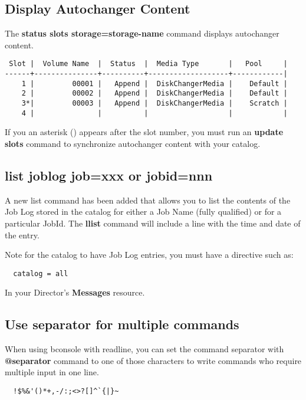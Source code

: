 \subsection{Display Autochanger Content}

The {\bf status slots storage=\lt{}storage-name\gt{}} command displays
autochanger content.

\footnotesize
\begin{verbatim}
 Slot |  Volume Name  |  Status  |  Media Type       |   Pool     |
------+---------------+----------+-------------------+------------|
    1 |         00001 |   Append |  DiskChangerMedia |    Default |
    2 |         00002 |   Append |  DiskChangerMedia |    Default |
    3*|         00003 |   Append |  DiskChangerMedia |    Scratch |
    4 |               |          |                   |            |
\end{verbatim}
\normalsize

If you an asterisk ({\bf *}) appears after the slot number, you must run an
{\bf update slots} command to synchronize autochanger content with your
catalog.

\subsection{list joblog job=xxx or jobid=nnn}
A new list command has been added that allows you to list the contents
of the Job Log stored in the catalog for either a Job Name (fully qualified)
or for a particular JobId.  The {\bf llist} command will include a line with
the time and date of the entry.

Note for the catalog to have Job Log entries, you must have a directive 
such as:

\begin{verbatim}
  catalog = all
\end{verbatim}

In your Director's {\bf Messages} resource.

\subsection{Use separator for multiple commands}
  When using bconsole with readline, you can set the command separator with 
  \textbf{@separator} command to one
  of those characters to write commands who require multiple input in one line.
\begin{verbatim}
  !$%&'()*+,-/:;<>?[]^`{|}~
\end{verbatim}


